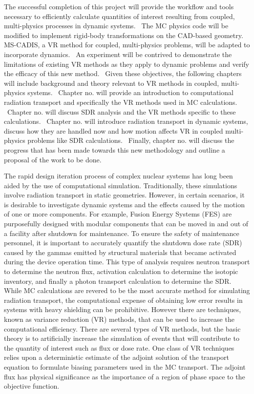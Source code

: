 The successful completion of this project will provide the workflow and tools
necessary to efficiently calculate quantities of interest resulting from
coupled, multi-physics processes in dynamic systems.  The MC physics code will
be modified to implement rigid-body transformations on the CAD-based geometry.
MS-CADIS, a VR method for coupled, multi-physics problems, will be adapted to
incorporate dynamics.  An experiment will be contrived to demonstrate the
limitations of existing VR methods as they apply to dynamic problems and verify
the efficacy of this new method.  Given these objectives, the following chapters
will include background and theory relevant to VR methods in coupled,
multi-physics systems.  Chapter no. will provide an introduction to computational
radiation transport and specifically the VR methods used in MC calculations.
 Chapter no. will discuss SDR analysis and the VR methods specific to these
calculations.  Chapter no. will introduce radiation transport in dynamic systems,
discuss how they are handled now and how motion affects VR in coupled
multi-physics problems like SDR calculations.  Finally, chapter no. will discuss
the progress that has been made towards this new methodology and outline a
proposal of the work to be done.

The rapid design iteration process of complex nuclear systems has long been
aided by the use of computational simulation.  Traditionally, these simulations
involve radiation transport in static geometries.  However, in certain
scenarios, it is desirable to investigate dynamic systems and the effects caused
by the motion of one or more components.  
For example, Fusion Energy Systems
(FES) are purposefully designed with modular components that can be moved in and
out of a facility after shutdown for maintenance.  
To ensure the safety of maintenance personnel, it is important to accurately quantify the
shutdown dose rate (SDR) caused by the gammas emitted by structural materials that became 
activated during the device operation time.  
This type of analysis requires neutron transport to determine the neutron flux,
activation calculation to determine the isotopic inventory, and finally a 
photon transport calculation to determine the SDR.
While MC calculations are revered to be the most accurate method for simulating
radiation transport, the computational expense of obtaining low error results 
in systems with heavy shielding can be prohibitive.  
However there are techniques, known as variance reduction (VR)
methods, that can be used to increase the computational efficiency.  
There are several types
of VR methods, but the basic theory is to artificially increase the simulation of
events that will contribute to the quantity of interest such as flux or dose
rate. 
 One class of VR techniques relies upon a deterministic estimate of the adjoint 
solution of the transport equation to
formulate biasing parameters used in the MC transport. 
The adjoint flux has physical significance as the importance of a region of
phase space to the objective function.

